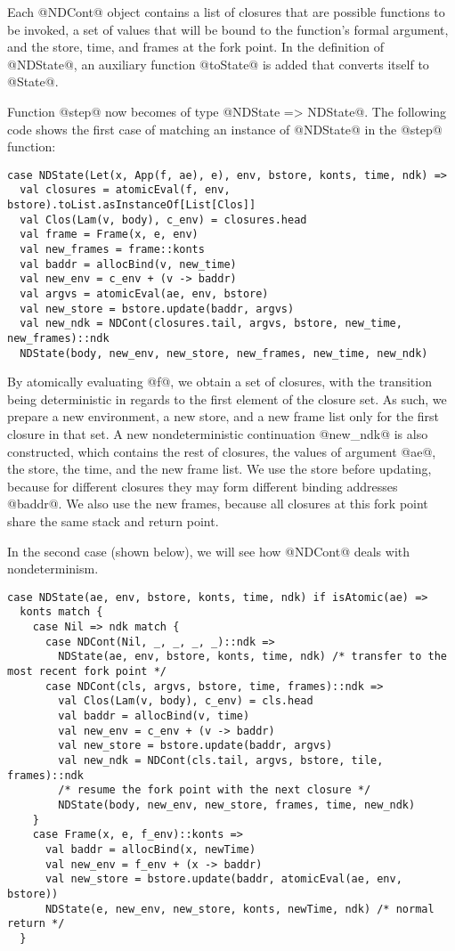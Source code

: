 \documentclass[acmsmall]{acmart}\settopmatter{}
\begin{document}
Each @NDCont@ object contains a list of closures that are possible functions to be invoked,
a set of values that will be bound to the function's formal argument,
and the store, time, and frames at the fork point.
In the definition of @NDState@, an auxiliary function @toState@ is added that
converts itself to @State@.

Function @step@ now becomes of type @NDState => NDState@.
The following code shows the first case of matching an instance of @NDState@ in
the @step@ function:

\begin{lstlisting}
case NDState(Let(x, App(f, ae), e), env, bstore, konts, time, ndk) =>
  val closures = atomicEval(f, env, bstore).toList.asInstanceOf[List[Clos]]
  val Clos(Lam(v, body), c_env) = closures.head
  val frame = Frame(x, e, env)
  val new_frames = frame::konts
  val baddr = allocBind(v, new_time)
  val new_env = c_env + (v -> baddr)
  val argvs = atomicEval(ae, env, bstore)
  val new_store = bstore.update(baddr, argvs)
  val new_ndk = NDCont(closures.tail, argvs, bstore, new_time, new_frames)::ndk
  NDState(body, new_env, new_store, new_frames, new_time, new_ndk)
\end{lstlisting}

By atomically evaluating @f@, we obtain a set of closures, with the transition being 
deterministic in regards to the first element of the closure set.
As such, we prepare a new environment, a new store, and a new frame list only for the
first closure in that set.
A new nondeterministic continuation @new_ndk@ is also constructed,
which contains the rest of closures, the values of argument @ae@, the store,
the time, and the new frame list.
We use the store before updating, because for different closures they may form
different binding addresses @baddr@.
We also use the new frames, because all closures at this fork point share
the same stack and return point.

In the second case (shown below), we will see how @NDCont@ deals with
nondeterminism.

\begin{lstlisting}
case NDState(ae, env, bstore, konts, time, ndk) if isAtomic(ae) =>
  konts match {
    case Nil => ndk match {
      case NDCont(Nil, _, _, _, _)::ndk =>
        NDState(ae, env, bstore, konts, time, ndk) /* transfer to the most recent fork point */
      case NDCont(cls, argvs, bstore, time, frames)::ndk =>
        val Clos(Lam(v, body), c_env) = cls.head
        val baddr = allocBind(v, time)
        val new_env = c_env + (v -> baddr)
        val new_store = bstore.update(baddr, argvs)
        val new_ndk = NDCont(cls.tail, argvs, bstore, tile, frames)::ndk
        /* resume the fork point with the next closure */
        NDState(body, new_env, new_store, frames, time, new_ndk)
    }
    case Frame(x, e, f_env)::konts =>
      val baddr = allocBind(x, newTime)
      val new_env = f_env + (x -> baddr)
      val new_store = bstore.update(baddr, atomicEval(ae, env, bstore))
      NDState(e, new_env, new_store, konts, newTime, ndk) /* normal return */
  }
\end{lstlisting}
\end{document}

